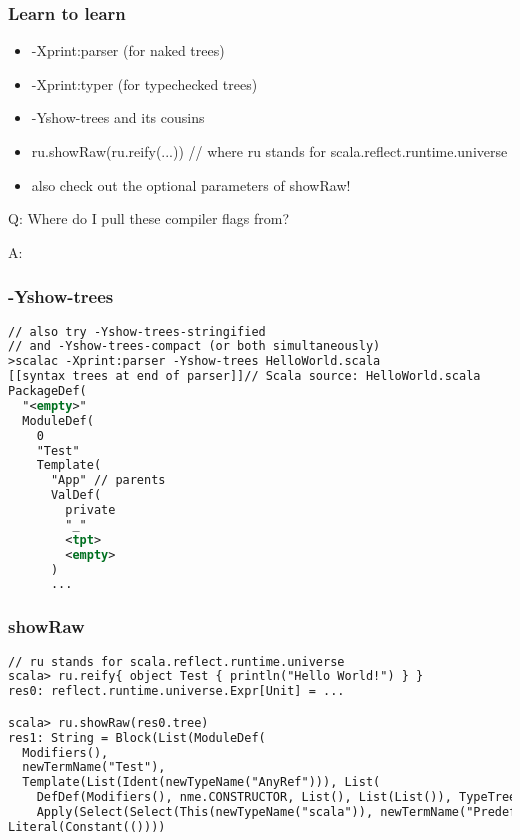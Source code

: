 \documentclass[hyperref={bookmarks=false}]{beamer}
\begin{document}
\begin{frame}[fragile]
\frametitle{Learn to learn}

\begin{itemize}
\item -Xprint:parser (for naked trees)
\item -Xprint:typer (for typechecked trees)
\item -Yshow-trees and its cousins
\item ru.showRaw(ru.reify(...)) // where ru stands for scala.reflect.runtime.universe
\item also check out the optional parameters of showRaw!
\end{itemize}

Q: Where do I pull these compiler flags from?

A: 

\end{frame}

\begin{frame}[fragile]
\frametitle{-Yshow-trees}

\begin{lstlisting}[language=XML]
// also try -Yshow-trees-stringified
// and -Yshow-trees-compact (or both simultaneously)
>scalac -Xprint:parser -Yshow-trees HelloWorld.scala
[[syntax trees at end of parser]]// Scala source: HelloWorld.scala
PackageDef(
  "<empty>"
  ModuleDef(
    0
    "Test"
    Template(
      "App" // parents
      ValDef(
        private
        "_"
        <tpt>
        <empty>
      )
      ...
\end{lstlisting}

\end{frame}

\begin{frame}[fragile]
\frametitle{showRaw}

\begin{lstlisting}[language=XML]
// ru stands for scala.reflect.runtime.universe
scala> ru.reify{ object Test { println("Hello World!") } }
res0: reflect.runtime.universe.Expr[Unit] = ...

scala> ru.showRaw(res0.tree)
res1: String = Block(List(ModuleDef(
  Modifiers(),
  newTermName("Test"),
  Template(List(Ident(newTypeName("AnyRef"))), List(
    DefDef(Modifiers(), nme.CONSTRUCTOR, List(), List(List()), TypeTree(), Block(List(Apply(Select(Super(This(tpnme.EMPTY), tpnme.EMPTY), nme.CONSTRUCTOR), List())), Literal(Constant(())))),
    Apply(Select(Select(This(newTypeName("scala")), newTermName("Predef")), newTermName("println")), List(Literal(Constant("Hello World!")))))))),
Literal(Constant(())))
\end{lstlisting}

\end{frame}
\end{document}
